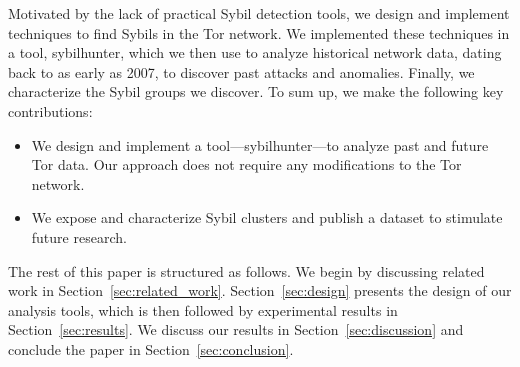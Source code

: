 Motivated by the lack of practical Sybil detection tools, we design and
implement techniques to find Sybils in the Tor network.  We implemented these
techniques in a tool, sybilhunter, which we then use to analyze historical
network data, dating back to as early as 2007, to discover past attacks and
anomalies.  Finally, we characterize the Sybil groups we discover.  To sum up,
we make the following key contributions:
\begin{itemize}
	\item We design and implement a tool---sybilhunter---to analyze past and
		future Tor data.  Our approach does not require any modifications to the
		Tor network.
	\item We expose and characterize Sybil clusters and publish a dataset to
		stimulate future research.
\end{itemize}

The rest of this paper is structured as follows.  We begin by discussing
related work in Section~\ref{sec:related_work}.  Section~\ref{sec:design}
presents the design of our analysis tools, which is then followed by
experimental results in Section~\ref{sec:results}.  We discuss our results in
Section~\ref{sec:discussion} and conclude the paper in
Section~\ref{sec:conclusion}.
